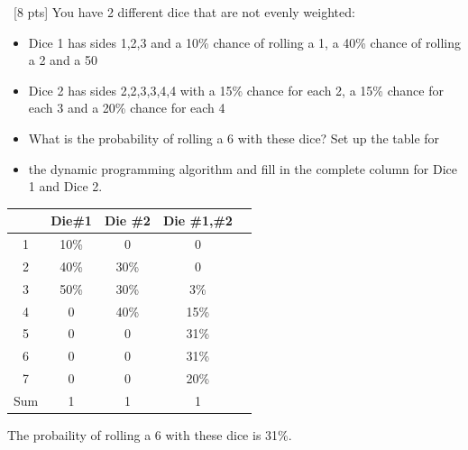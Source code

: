 \documentclass[12pt]{article}
\newenvironment{sol}[1][Solution]{\begin{trivlist}\item[\hskip\labelsep {\bfseries #1:}]}{\end{trivlist}}
\begin{document}
\begin{enumerate}
    \item \ [8 pts] You have 2 different dice that are not evenly weighted:
    \begin{itemize}
        \item Dice 1 has sides {1,2,3} and a 10\% chance of rolling a 1, a 40\% chance of rolling a 2 and a 50%
        \item Dice 2 has sides {2,2,3,3,4,4} with a 15\% chance for each 2, a 15\% chance for each 3 and a 20\% chance for each 4
        \item What is the probability of rolling a 6 with these dice? Set up the table for
        \item the dynamic programming algorithm and fill in the complete column for Dice 1 and Dice 2.
    \end{itemize}
            \begin{sol}
        \hspace*{\fill}
        \begin{center}
            \begin{tabular}{|c|c|c|c|c|}
            \hline
                 & Die\#1 & Die \#2 & Die \#1,\#2\\
                \hline
                1& 10\% & 0  & 0 \\
                \hline
                2& 40\% &30\%  & 0\\
                \hline
                3& 50\% &30\% & 3\%\\
                \hline
                4 & 0 & 40\%  &15\% \\
                \hline
                5& 0 &0  & 31\% \\
                \hline
                6 & 0 & 0 & 31\%\\
                \hline
                7 & 0 & 0 & 20\%\\
                \hline
                Sum& 1 &1 & 1  \\
                \hline
            \end{tabular}
        \end{center}
        The probaility of rolling a 6 with these dice is 31\%.
        \end{sol}

\end{enumerate}
\end{document}
